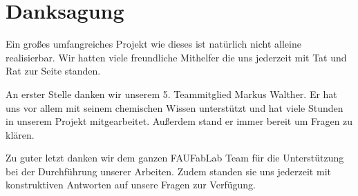 \section{Danksagung}

Ein großes umfangreiches Projekt wie dieses ist natürlich nicht alleine realisierbar. Wir hatten viele freundliche Mithelfer die uns jederzeit mit Tat und Rat zur Seite standen.

An erster Stelle danken wir unserem 5. Teammitglied Markus Walther. Er hat uns vor allem mit seinem chemischen Wissen unterstützt und hat viele Stunden in unserem Projekt mitgearbeitet. Außerdem stand er immer bereit um Fragen zu klären.

Zu guter letzt danken wir dem ganzen FAUFabLab Team für die Unterstützung bei der Durchführung unserer Arbeiten. Zudem standen sie uns jederzeit mit konstruktiven Antworten auf unsere Fragen zur Verfügung.
